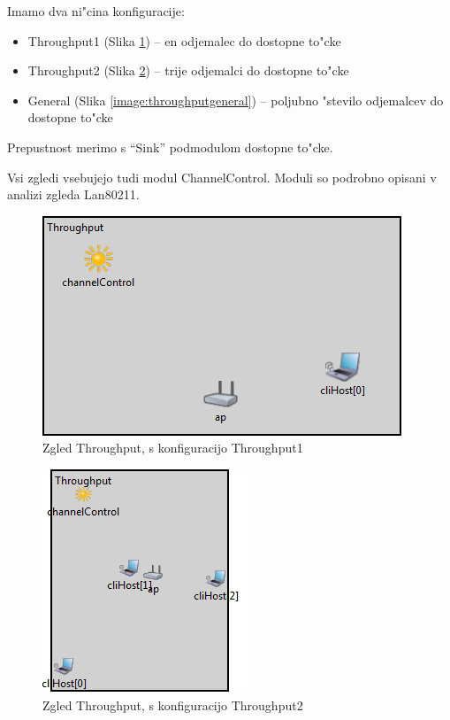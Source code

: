 \documentclass[a4paper,11pt]{article}
\begin{document}
Imamo dva ni"cina konfiguracije:

\begin{itemize}
    \item Throughput1 (Slika \ref{image:throughputthr1}) – en odjemalec do dostopne to"cke
    \item Throughput2 (Slika \ref{image:throughputthr2}) – trije odjemalci do dostopne to"cke
    \item General (Slika \ref{image:throughputgeneral}) – poljubno "stevilo odjemalcev do dostopne to"cke
\end{itemize}

Prepustnost merimo s ``Sink'' podmodulom dostopne to"cke.

Vsi zgledi vsebujejo tudi modul ChannelControl. Moduli so podrobno opisani v analizi zgleda Lan80211.


\begin{figure}[htbp]
    \begin{center}
        \includegraphics[scale=0.8]{img/zgledi/throughput_thr1.png}
        \caption{Zgled Throughput, s konfiguracijo Throughput1}
	\label{image:throughputthr1}
    \end{center}
\end{figure}


\begin{figure}[htbp]
    \begin{center}
        \includegraphics[scale=0.8]{img/zgledi/throughput_thr2.png}
        \caption{Zgled Throughput, s konfiguracijo Throughput2}
	\label{image:throughputthr2}
    \end{center}
\end{figure}
\end{document}
